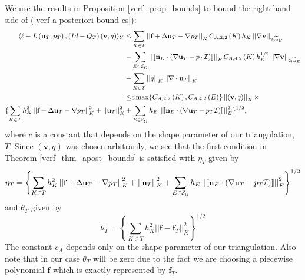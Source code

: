 \documentclass[12pt,a4paper]{article}
\theoremstyle{definition}
\begin{document}
We use the results in Proposition \ref{verf_prop_bounds} to bound the right-hand side of (\ref{verf-a-posteriori-bound-cs}):
\begin{equation}\small
\begin{aligned}\small
\langle \ell -L\left(\textbf{u}_T,p_T\right),\left(Id-Q_T\right)\left(\textbf{v},q\right) \rangle_Y\leq
&\sum_{K\in T}\left|\left|\textbf{f}+\Delta \textbf{u}_T-\nabla p_T \right|\right|_K C_{A,2,2}\left(K\right)h_K \left|\left|\nabla\textbf{v}\right|\right|_{2;\widetilde{\omega}_K}\\
-&\sum_{E\in \mathcal{E}_{\Omega}}\left|\left|\llbracket\textbf{n}_E\cdot\left(\nabla \textbf{u}_T-p_T\mathcal{I}\right)\rrbracket \right|\right|_EC_{A,4,2}\left(K\right)h_E^{1/2} \left|\left|\nabla\textbf{v}\right|\right|_{2;\widetilde{\omega}_E}\\
-&\sum_{K\in T}\left|\left|q\right|\right|_K\left|\left|\nabla \cdot \textbf{u}_T\right|\right|_K\\
\leq &c\max \{C_{A,2,2}\left(K\right),C_{A,4,2}\left(E\right)\}\left|\left|\left(\textbf{v},q\right)\right|\right|_X\times\\ \{\sum_{K\in T}h^2_K\left|\left|\textbf{f}+\Delta \textbf{u}_T-\nabla p_T \right|\right|_K^2+\left|\left|\textbf{u}_T\right|\right|^2_K+&\sum_{E\in \mathcal{E}_{\Omega}}h_E\left|\left|\llbracket\textbf{n}_E\cdot\left(\nabla \textbf{u}_T-p_T\mathcal{I}\right)\rrbracket \right|\right|_E^2 \}^{1/2},
\end{aligned}
\end{equation}
where $c$ is a constant that depends on the shape parameter of our triangulation, $T$.  Since $\left(\textbf{v},q\right)$ was chosen arbitrarily, we see that the first condition in Theorem \ref{verf_thm_apost_bounds} is satisfied with $\eta_T$ given by  
\begin{equation}\small
\eta_T=\left\lbrace \sum_{K\in T}h^2_K\left|\left|\textbf{f}+\Delta \textbf{u}_T-\nabla p_T \right|\right|_K^2+\left|\left|\textbf{u}_T\right|\right|^2_K+\sum_{E\in \mathcal{E}_{\Omega}}h_E\left|\left|\llbracket\textbf{n}_E\cdot\left(\nabla \textbf{u}_T-p_T\mathcal{I}\right)\rrbracket \right|\right|_E^2  \right\rbrace ^{1/2}
\end{equation}
and $\theta_T$ given by 
\begin{equation}
\theta_T=\left \lbrace \sum_{K\in T}h^2_K\left|\left|\textbf{f}-\textbf{f}_T\right|\right|^2_K \right \rbrace^{1/2}
\end{equation}
The constant $c_A$ depends only on the shape parameter of our triangulation.  Also note that in our case $\theta_T$ will be zero due to the fact we are choosing a piecewise polynomial $\textbf{f}$ which is exactly represented by $\textbf{f}_T$. 
\end{document}
